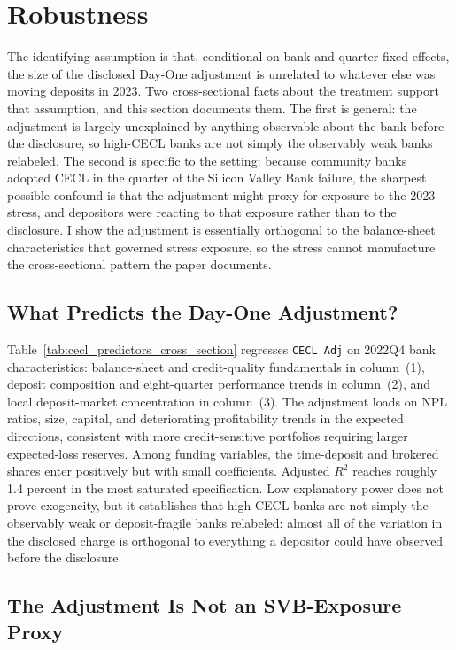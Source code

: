 \section{Robustness}
\label{sec:robustness}

The identifying assumption is that, conditional on bank and quarter
fixed effects, the size of the disclosed Day-One adjustment is
unrelated to whatever else was moving deposits in 2023.  Two
cross-sectional facts about the treatment support that assumption, and
this section documents them.  The first is general: the adjustment is
largely unexplained by anything observable about the bank before the
disclosure, so high-CECL banks are not simply the observably weak
banks relabeled.  The second is specific to the setting: because
community banks adopted CECL in the quarter of the Silicon Valley Bank
failure, the sharpest possible confound is that the adjustment might
proxy for exposure to the 2023 stress, and depositors were reacting to
that exposure rather than to the disclosure.  I show the adjustment is
essentially orthogonal to the balance-sheet characteristics that
governed stress exposure, so the stress cannot manufacture the
cross-sectional pattern the paper documents.

\subsection{What Predicts the Day-One Adjustment?}
\label{sec:robustness:predictors}

Table~\ref{tab:cecl_predictors_cross_section} regresses
\texttt{CECL Adj} on 2022Q4 bank characteristics: balance-sheet and
credit-quality fundamentals in column~(1), deposit composition and
eight-quarter performance trends in column~(2), and local
deposit-market concentration in column~(3).  The adjustment loads on
NPL ratios, size, capital, and deteriorating profitability trends in
the expected directions, consistent with more credit-sensitive
portfolios requiring larger expected-loss reserves.  Among funding
variables, the time-deposit and brokered shares enter positively but
with small coefficients.  Adjusted $R^2$ reaches roughly 1.4 percent
in the most saturated specification.  Low explanatory power does not
prove exogeneity, but it establishes that high-CECL banks are not
simply the observably weak or deposit-fragile banks relabeled: almost
all of the variation in the disclosed charge is orthogonal to
everything a depositor could have observed before the disclosure.

\subsection{The Adjustment Is Not an SVB-Exposure Proxy}
\label{sec:robustness:svb}

